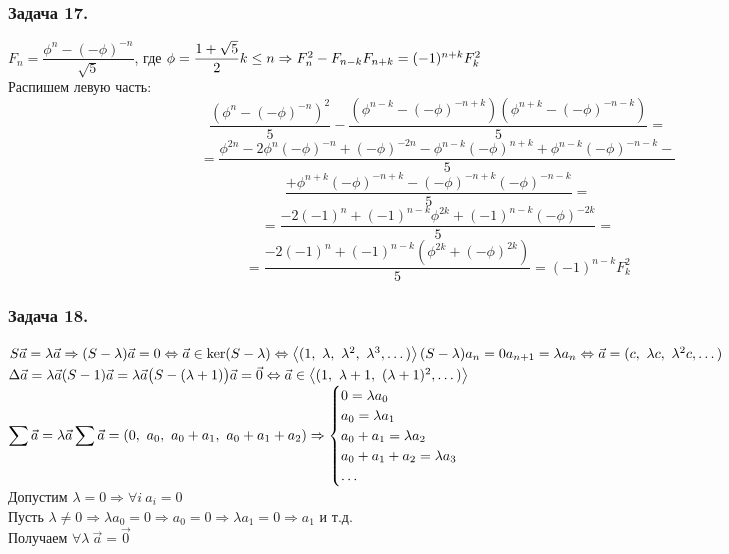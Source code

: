 \documentclass[12pt, letterpaper, twoside]{article}
\begin{document}
    \subsubsection*{Задача 17.}
    $F_n = \dfrac{\phi^n - (-\phi)^{-n}}{\sqrt{5}}$, где $\phi = \dfrac{1 + \sqrt{5}}{2}\\
    k\leq n\Rightarrow F^2_n - F_{n - k}F_{n + k} = (-1)^{n + k}F^2_k$\\
    Распишем левую часть:
    \[\frac{\left(\phi^n - (-\phi)^{-n}\right)^2}{5} - \frac{\left(\phi^{n - k} - (-\phi)^{-n + k}\right)\left(\phi^{n + k} - (-\phi)^{-n - k}\right)}{5} =\]
    \[= \frac{\phi^{2n} - 2\phi^n(-\phi)^{-n} + (-\phi)^{-2n} - \phi^{n - k}(-\phi)^{n + k} +\phi^{n - k}(-\phi)^{-n - k}-}{5}\]
    \[\frac{+\phi^{n + k}(-\phi)^{-n + k} - (-\phi)^{-n + k}(-\phi)^{-n- k}}{5}=\]
    \[=\frac{-2(-1)^n + (-1)^{n - k}\phi^{2k} + (-1)^{n - k}(-\phi)^{-2k}}{5}=\]
    \[=\frac{-2(-1)^n + (-1)^{n - k}(\phi^{2k} + (-\phi)^{2k})}{5} = (-1)^{n - k}F_k^2\]
    \subsubsection*{Задача 18.}
    $S\vec{a} = \lambda \vec{a}\Rightarrow (S - \lambda)\vec{a} = 0\Leftrightarrow \vec{a} \in \ker (S - \lambda)\Leftrightarrow \left< (1,\ \lambda,\ \lambda^2,\ \lambda^3,\dots) \right>\\
    (S - \lambda) a_n = 0\\
    a_{n + 1} = \lambda a_n\Leftrightarrow \vec{a} = (c,\ \lambda c,\ \lambda^2 c,\dots)$
    $\Delta \vec{a} = \lambda \vec{a}\\
    (S - 1)\vec{a} = \lambda \vec{a}\\
    \big(S - (\lambda + 1)\big)\vec{a} = \vec{0}\Leftrightarrow \vec{a}\in \left< (1,\ \lambda + 1,\ (\lambda + 1)^2,\dots) \right>$\\
    $\displaystyle\sum \vec{a} = \lambda \vec{a}\\
    \sum \vec{a} = (0,\ a_0,\ a_0 + a_1,\ a_0 + a_1 + a_2)\Rightarrow\begin{cases}
        0 = \lambda a_0\\
        a_0 = \lambda a_1\\
        a_0 + a_1 = \lambda a_2\\
        a_0 + a_1 + a_2 = \lambda a_3\\
        \dots
    \end{cases}$\\
    Допустим $\lambda = 0\Rightarrow \forall i\ a_i = 0$\\
    Пусть $\lambda\neq 0\Rightarrow \lambda a_0 = 0\Rightarrow a_0 = 0 \Rightarrow \lambda a_1 = 0\Rightarrow a_1$ и т.д.\\
    Получаем $\forall \lambda\ \vec{a} = \vec{0}$
\end{document}
